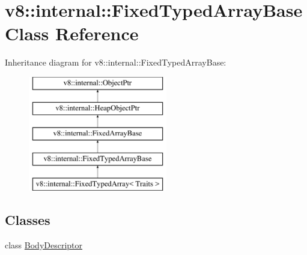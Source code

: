 \hypertarget{classv8_1_1internal_1_1FixedTypedArrayBase}{}\section{v8\+:\+:internal\+:\+:Fixed\+Typed\+Array\+Base Class Reference}
\label{classv8_1_1internal_1_1FixedTypedArrayBase}
Inheritance diagram for v8\+:\+:internal\+:\+:Fixed\+Typed\+Array\+Base\+:\begin{figure}[H]
\begin{center}
\leavevmode
\includegraphics[height=5.000000cm]{classv8_1_1internal_1_1FixedTypedArrayBase}
\end{center}
\end{figure}
\subsection*{Classes}
\begin{DoxyCompactItemize}
\item 
class \mbox{\hyperlink{classv8_1_1internal_1_1FixedTypedArrayBase_1_1BodyDescriptor}{Body\+Descriptor}}
\end{DoxyCompactItemize}
